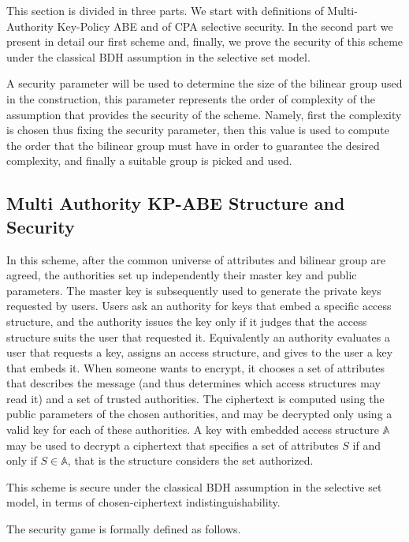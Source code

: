 

This section is divided in three parts. We start with  definitions of Multi-Authority Key-Policy ABE and of CPA selective security. In the second part we present in detail our first scheme and, finally, we prove the security of this scheme under the classical BDH assumption in the selective set model.

A security parameter will be used to determine the size of the bilinear group used in the construction, this parameter represents the order of complexity of the assumption that provides the security of the scheme.
Namely, first the complexity is chosen thus fixing the security parameter, then this value is used to compute the order that the bilinear group must have in order to guarantee the desired complexity, and finally a suitable group is picked and used.

\subsection{Multi Authority KP-ABE Structure and Security}\label{KP-ABE}

  In this scheme, after the common universe of attributes and bilinear group are agreed, the authorities set up independently their master key and public parameters.
  The master key is subsequently used to generate the private keys requested by users.
  Users ask an authority for keys that embed a specific access structure, and the authority issues the key only if it judges that the access structure suits the user that requested it.
  Equivalently an authority evaluates a user that requests a key, assigns an access structure, and gives to the user a key that embeds it.
  When someone wants to encrypt, it chooses a set of attributes that describes the message (and thus determines which access structures may read it) and a set of trusted authorities.
  The ciphertext is computed using the public parameters of the chosen authorities, and may be decrypted only using a valid key for each of these authorities.
  A key with embedded access structure $\mathbb{A}$ may be used to decrypt a ciphertext that specifies a set of attributes $S$ if and only if $S \in \mathbb{A}$, that is the structure considers the set authorized.

  This scheme is secure under the classical BDH assumption in the selective set model, in terms of chosen-ciphertext indistinguishability.

  The security game is formally defined as follows.\\

